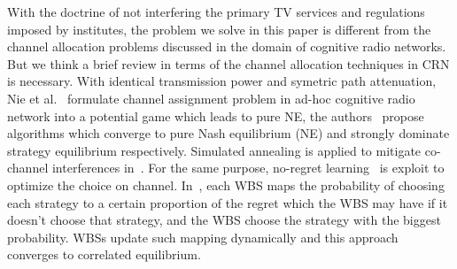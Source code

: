 \documentclass[times]{ettauth}
\theoremstyle{mytheoremstyle}
\theoremstyle{mytheoremstyle}
\theoremstyle{mytheoremstyle}
\begin{document}
With the doctrine of not interfering the primary TV services and regulations imposed by institutes, the problem we solve in this paper is different from the channel allocation problems discussed in the domain of cognitive radio networks.
But we think a brief review in terms of the channel allocation techniques in CRN is necessary.
%
With identical transmission power and symetric path attenuation, Nie et al.~\cite{CApotentialLearning_05dyspan} formulate channel assignment problem in ad-hoc cognitive radio network into a potential game which leads to pure NE, the authors~\cite{CA_Felegyhazi_07infocom, Wu_GOP_CA_08infocom} propose algorithms which converge to pure Nash equilibrium (NE) and strongly dominate strategy equilibrium respectively. 
Simulated annealing is applied to mitigate co-channel interferences in~\cite{SA_CA_TVWS_2012crowncom}.
For the same purpose, no-regret learning~\cite{qlearning_huang, hart00correlatedeq} is exploit to optimize the choice on channel.
In~\cite{hart00correlatedeq}, each WBS maps the probability of choosing each strategy to a certain proportion of the regret which the WBS may have if it doesn't choose that strategy, and the WBS choose the strategy with the biggest probability.  
WBSs update such mapping dynamically and this approach converges to correlated equilibrium. 


\end{document}
